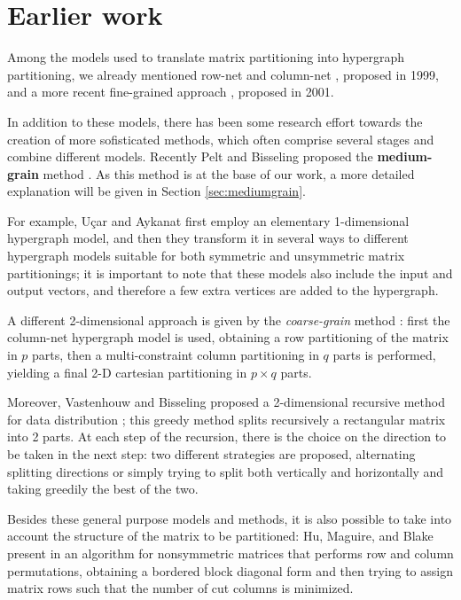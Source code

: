 \section{Earlier work} \label{sec:earlier_work} 

Among the models used to translate matrix partitioning into hypergraph partitioning, we already mentioned row-net and column-net \cite{hypergraph_model}, proposed in 1999, and a more recent fine-grained approach \cite{hypergraph_finegrain}, proposed in 2001. 

In addition to these models, there has been some research effort towards the creation of more sofisticated methods, which often comprise several stages and combine different models. Recently Pelt and Bisseling proposed the \textbf{medium-grain} method \cite{mediumgrain}.  As this method is at the base of our work, a more detailed explanation will be given in Section \ref{sec:mediumgrain}.

For example, Uçar and Aykanat \cite{hypergraph_revisiting} first employ an elementary 1-dimensional hypergraph model, and then they transform it in several ways to different hypergraph models suitable for both symmetric and unsymmetric matrix partitionings; it is important to note that these models also include the input and output vectors, and therefore a few extra vertices are added to the hypergraph.

A different 2-dimensional approach is given by the \emph{coarse-grain} method \cite{hypergraph_coarsegrain}: first the column-net hypergraph model is used, obtaining a row partitioning of the matrix in $p$ parts, then a multi-constraint column partitioning in $q$ parts is performed, yielding a final 2-D cartesian partitioning in $p \times q$ parts. 

Moreover, Vastenhouw and Bisseling proposed a 2-dimensional recursive method for data distribution \cite{mondriaan}; this greedy method splits recursively a rectangular matrix into 2 parts.
At each step of the recursion, there is the choice on the direction to be taken in the next step: two different strategies are proposed, alternating splitting directions or simply trying to split both vertically and horizontally and taking greedily the best of the two.

Besides these general purpose models and methods, it is also possible to take into account the structure of the matrix to be partitioned: Hu, Maguire, and Blake present in \cite{hu2000} an algorithm for nonsymmetric matrices that performs row and column permutations, obtaining a bordered block diagonal form and then trying to assign matrix rows such that the number of cut columns is minimized.

